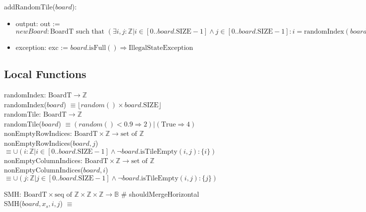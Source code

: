 \documentclass[12pt]{article}
\begin{document}
\noindent addRandomTile($board$):
\begin{itemize}
\item output: out := $newBoard : \text{BoardT} \text{ such that }  (\exists i, j : \mathbb{Z} | i \in [0..board.\text{SIZE} - 1] \wedge j  \in [0..board.\text{SIZE} - 1] : i = \text{randomIndex}(board) \wedge  j = \text{randomIndex}(board) \wedge board.\text{isTileEmpty}(i, j) \wedge (\forall x, y : \mathbb{Z} | \mathit{x} \in [0..board.\text{SIZE} - 1] \wedge \mathit{y} \in [0..board.\text{SIZE} - 1] :  (\mathit{x} \neq i) \wedge  (\mathit{y} \neq j) \wedge newBoard.\text{getTile}(x, y) = board.\text{getTile}(x, y) \wedge newBoard.\text{getTile}(i, j) = \text{randomTile}(board)))$
\item exception: exc := $board.\text{isFull}() \Rightarrow \text{IllegalStateException}$
\end{itemize}

\subsection* {Local Functions}
\noindent randomIndex: $\text{BoardT} \rightarrow \mathbb{Z}$ \\
\noindent randomIndex($board$) $\equiv \lfloor  random() \times board.\text{SIZE} \rfloor$ \\

\noindent randomTile: $\text{BoardT} \rightarrow \mathbb{Z}$ \\
\noindent randomTile($board$) $\equiv (random() < 0.9 \Rightarrow 2) | (\text{True} \Rightarrow 4)$ \\

\noindent nonEmptyRowIndices: $\text{BoardT} \times  \mathbb{Z} \rightarrow \text{set of } \mathbb{Z}$ \\
\noindent nonEmptyRowIndices($board, j$) \\ $\equiv \cup(i:\mathbb{Z} | i \in [0..board.\text{SIZE}-1] \wedge \lnot board.\text{isTileEmpty}(i,j):\{i\})$ \\

\noindent nonEmptyColumnIndices: $\text{BoardT} \times  \mathbb{Z} \rightarrow \text{set of } \mathbb{Z}$ \\
\noindent nonEmptyColumnIndices($board, i$) \\ $\equiv \cup(j:\mathbb{Z} | j \in [0..board.\text{SIZE}-1] \wedge \lnot board.\text{isTileEmpty}(i,j):\{j\})$

\newpage 

\noindent SMH: $\text{BoardT} \times \text{seq of } \mathbb{Z} \times \mathbb{Z}  \times \mathbb{Z} \rightarrow \mathbb{B}$ \# shouldMergeHorizontal \\
\noindent SMH($board, x_s, i, j$)  $\equiv $ \\
\end{document}
